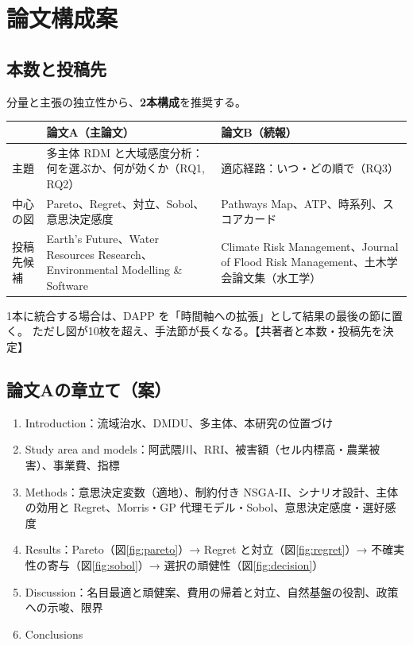 \documentclass[a4paper,10pt]{ltjsarticle}
\newcommand{\todo}[1]{\textcolor{corange}{【#1】}}
\begin{document}
\section{論文構成案}
\label{sec:structure}

\subsection{本数と投稿先}
分量と主張の独立性から、\textbf{2本構成}を推奨する。

\begin{table}[h]
\centering\small
\begin{tabularx}{\linewidth}{@{}lXX@{}}
\toprule
 & 論文A（主論文） & 論文B（続報） \\
\midrule
主題 & 多主体 RDM と大域感度分析：何を選ぶか、何が効くか（RQ1, RQ2） & 適応経路：いつ・どの順で（RQ3） \\
中心の図 & Pareto、Regret、対立、Sobol、意思決定感度 & Pathways Map、ATP、時系列、スコアカード \\
投稿先候補 & Earth's Future、Water Resources Research、Environmental Modelling \& Software & Climate Risk Management、Journal of Flood Risk Management、土木学会論文集（水工学） \\
\bottomrule
\end{tabularx}
\end{table}

1本に統合する場合は、DAPP を「時間軸への拡張」として結果の最後の節に置く。
ただし図が10枚を超え、手法節が長くなる。\todo{共著者と本数・投稿先を決定}

\subsection{論文Aの章立て（案）}
\begin{enumerate}
\item Introduction：流域治水、DMDU、多主体、本研究の位置づけ
\item Study area and models：阿武隈川、RRI、被害額（セル内標高・農業被害）、事業費、指標
\item Methods：意思決定変数（適地）、制約付き NSGA-II、シナリオ設計、主体の効用と Regret、Morris・GP 代理モデル・Sobol、意思決定感度・選好感度
\item Results：Pareto（図\ref{fig:pareto}）→ Regret と対立（図\ref{fig:regret}）→ 不確実性の寄与（図\ref{fig:sobol}）→ 選択の頑健性（図\ref{fig:decision}）
\item Discussion：名目最適と頑健案、費用の帰着と対立、自然基盤の役割、政策への示唆、限界
\item Conclusions
\end{enumerate}
\end{document}
